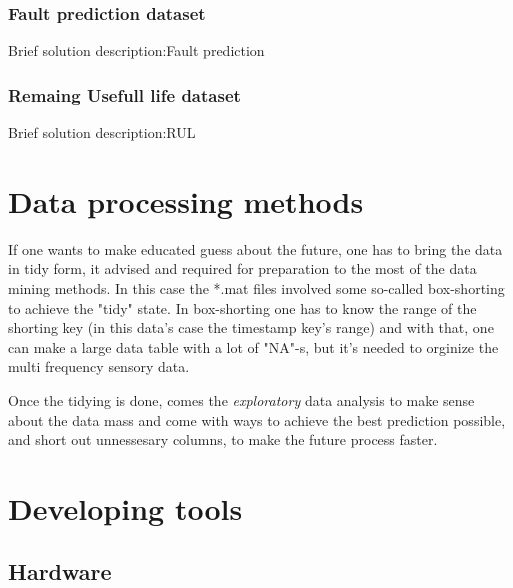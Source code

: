 			\subsubsection{Fault prediction dataset}
Brief solution description:Fault prediction
			\subsubsection{Remaing Usefull life dataset}
Brief solution description:RUL
	\section{Data processing methods}


				\noindent
If one wants to make educated guess about the future, one has to bring the data in tidy
form, it advised and required for preparation to the most of the data mining methods.
				\noindent
In this case the *.mat files involved some so-called box-shorting to achieve the "tidy" state. In box-shorting one has to know the range of the shorting key (in this data's case the timestamp key's range) and with that, one can make a large data table with a lot of "NA"-s, but it's needed to orginize the multi frequency sensory data.

Once the tidying is done, comes the \textit{exploratory} data analysis to make sense about the data mass and come with ways to achieve the best prediction possible, and short out unnessesary columns, to make the future process faster.
	\section{Developing tools}
		\subsection{Hardware}
